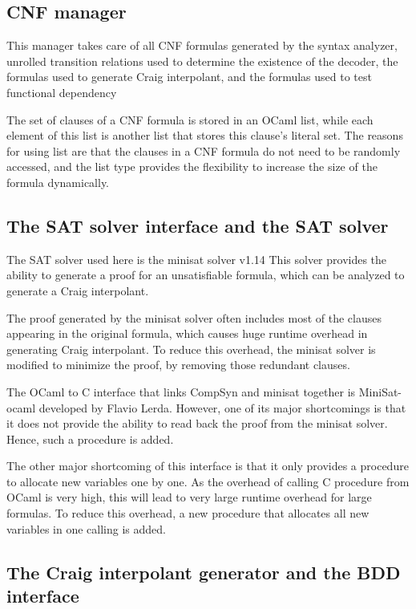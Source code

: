 \documentclass[runningheads,a4paper]{llncs}
\begin{document}
\subsection{CNF manager}

This manager takes care of all CNF formulas generated by the syntax analyzer,
unrolled transition relations used to determine the existence of the decoder,
the formulas used to generate Craig interpolant,
and the formulas used to test functional dependency 

The set of clauses of a CNF formula is stored in an OCaml list,
while each element of this list is another list that stores this clause's literal set.
The reasons for using list are that the clauses in a CNF formula do not need to be randomly accessed,
and the list type provides the flexibility to increase the size of the formula dynamically.

\subsection{The SAT solver interface and the SAT solver}

The SAT solver used here is the minisat solver v1.14 
This solver provides the ability to generate a proof for an unsatisfiable formula,
which can be analyzed to generate a Craig interpolant.

The proof generated by the minisat solver often includes most of the clauses appearing in the original formula,
which causes huge runtime overhead in generating Craig interpolant.
To reduce this overhead,
the minisat solver is modified to minimize the proof,
by removing those redundant clauses.

The OCaml to C interface that links CompSyn and minisat together is MiniSat-ocaml  developed by Flavio Lerda.
However,
one of its major shortcomings is that it does not provide the ability to read back the proof from the minisat solver.
Hence,
such a procedure is added.

The other major shortcoming of this interface is that it only provides a procedure to allocate new variables one by one.
As the overhead of calling C procedure from OCaml is very high,
this will lead to very large runtime overhead for large formulas.
To reduce this overhead,
a new procedure that allocates all new variables in one calling is added.

\subsection{The Craig interpolant generator and the BDD interface}
\end{document}
